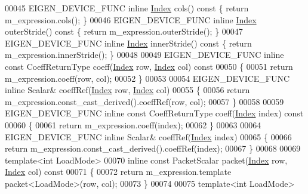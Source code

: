 \begin{DoxyCode}
00045     EIGEN\_DEVICE\_FUNC \textcolor{keyword}{inline} \hyperlink{namespace_eigen_a62e77e0933482dafde8fe197d9a2cfde}{Index} cols()\textcolor{keyword}{ const }\{ \textcolor{keywordflow}{return} m\_expression.cols(); \}
00046     EIGEN\_DEVICE\_FUNC \textcolor{keyword}{inline} \hyperlink{namespace_eigen_a62e77e0933482dafde8fe197d9a2cfde}{Index} outerStride()\textcolor{keyword}{ const }\{ \textcolor{keywordflow}{return} m\_expression.outerStride(); \}
00047     EIGEN\_DEVICE\_FUNC \textcolor{keyword}{inline} \hyperlink{namespace_eigen_a62e77e0933482dafde8fe197d9a2cfde}{Index} innerStride()\textcolor{keyword}{ const }\{ \textcolor{keywordflow}{return} m\_expression.innerStride(); \}
00048 
00049     EIGEN\_DEVICE\_FUNC \textcolor{keyword}{inline} \textcolor{keyword}{const} CoeffReturnType coeff(\hyperlink{namespace_eigen_a62e77e0933482dafde8fe197d9a2cfde}{Index} row, \hyperlink{namespace_eigen_a62e77e0933482dafde8fe197d9a2cfde}{Index} col)\textcolor{keyword}{ const}
00050 \textcolor{keyword}{    }\{
00051       \textcolor{keywordflow}{return} m\_expression.coeff(row, col);
00052     \}
00053 
00054     EIGEN\_DEVICE\_FUNC \textcolor{keyword}{inline} Scalar& coeffRef(\hyperlink{namespace_eigen_a62e77e0933482dafde8fe197d9a2cfde}{Index} row, \hyperlink{namespace_eigen_a62e77e0933482dafde8fe197d9a2cfde}{Index} col)
00055     \{
00056       \textcolor{keywordflow}{return} m\_expression.const\_cast\_derived().coeffRef(row, col);
00057     \}
00058 
00059     EIGEN\_DEVICE\_FUNC \textcolor{keyword}{inline} \textcolor{keyword}{const} CoeffReturnType coeff(\hyperlink{namespace_eigen_a62e77e0933482dafde8fe197d9a2cfde}{Index} index)\textcolor{keyword}{ const}
00060 \textcolor{keyword}{    }\{
00061       \textcolor{keywordflow}{return} m\_expression.coeff(index);
00062     \}
00063 
00064     EIGEN\_DEVICE\_FUNC \textcolor{keyword}{inline} Scalar& coeffRef(\hyperlink{namespace_eigen_a62e77e0933482dafde8fe197d9a2cfde}{Index} index)
00065     \{
00066       \textcolor{keywordflow}{return} m\_expression.const\_cast\_derived().coeffRef(index);
00067     \}
00068 
00069     \textcolor{keyword}{template}<\textcolor{keywordtype}{int} LoadMode>
00070     \textcolor{keyword}{inline} \textcolor{keyword}{const} PacketScalar packet(\hyperlink{namespace_eigen_a62e77e0933482dafde8fe197d9a2cfde}{Index} row, \hyperlink{namespace_eigen_a62e77e0933482dafde8fe197d9a2cfde}{Index} col)\textcolor{keyword}{ const}
00071 \textcolor{keyword}{    }\{
00072       \textcolor{keywordflow}{return} m\_expression.template packet<LoadMode>(row, col);
00073     \}
00074 
00075     \textcolor{keyword}{template}<\textcolor{keywordtype}{int} LoadMode>

\end{DoxyCode}
